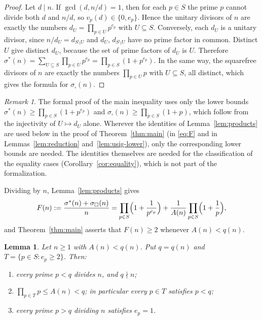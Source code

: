 \documentclass[11pt,a4paper]{amsart}
\newtheorem{lemma}[theorem]{Lemma}
\theoremstyle{definition}
\theoremstyle{remark}
\newtheorem{remark}[theorem]{Remark}
\newcommand{\usig}{\sigma^{*}}
\newcommand{\ssq}{\sigma_{\square}}
\begin{document}
\begin{proof}
Let $d \mid n$. If $\gcd(d,n/d)=1$, then for each $p \in S$ the prime $p$ cannot divide both $d$ and $n/d$, so $v_p(d) \in \{0,e_p\}$. Hence the unitary divisors of $n$ are exactly the numbers $d_U = \prod_{p\in U}p^{e_p}$ with $U \subseteq S$. Conversely, each $d_U$ is a unitary divisor, since $n/d_U = d_{S\setminus U}$ and $d_U$, $d_{S\setminus U}$ have no prime factor in common. Distinct $U$ give distinct $d_U$, because the set of prime factors of $d_U$ is $U$. Therefore $\usig(n) = \sum_{U \subseteq S} \prod_{p\in U}p^{e_p} = \prod_{p\in S}(1+p^{e_p})$. In the same way, the squarefree divisors of $n$ are exactly the numbers $\prod_{p \in U} p$ with $U\subseteq S$, all distinct, which gives the formula for $\ssq(n)$.
\end{proof}

\begin{remark}
The formal proof of the main inequality uses only the lower bounds $\usig(n) \ge \prod_{p\in S}(1+p^{e_p})$ and $\ssq(n) \ge \prod_{p \in S}(1+p)$, which follow from the injectivity of $U \mapsto d_U$ alone. Wherever the identities of Lemma~\ref{lem:products} are used below in the proof of Theorem~\ref{thm:main} (in \eqref{eq:F} and in Lemmas~\ref{lem:reduction} and~\ref{lem:usig-lower}), only the corresponding lower bounds are needed. The identities themselves are needed for the classification of the equality cases (Corollary~\ref{cor:equality}), which is not part of the formalization.
\end{remark}

Dividing by $n$, Lemma~\ref{lem:products} gives
\begin{equation}\label{eq:F}
  F(n) := \frac{\usig(n)+\ssq(n)}{n} = \prod_{p\in S}\Bigl(1+\frac{1}{p^{e_p}}\Bigr) + \frac{1}{A(n)}\prod_{p\in S}\Bigl(1+\frac1p\Bigr),
\end{equation}
and Theorem~\ref{thm:main} asserts that $F(n) \ge 2$ whenever $A(n)<q(n)$.

\begin{lemma}\label{lem:structure}
Let $n \ge 1$ with $A(n) < q(n)$. Put $q = q(n)$ and $T = \{p \in S : e_p \ge 2\}$. Then:
\begin{enumerate}[label=\textup{(\roman*)},leftmargin=2.2em]
  \item every prime $p < q$ divides $n$, and $q \nmid n$;
  \item $\prod_{p \in T} p \le A(n) < q$; in particular every $p\in T$ satisfies $p<q$;
  \item every prime $p > q$ dividing $n$ satisfies $e_p = 1$.
\end{enumerate}
\end{lemma}
\end{document}
